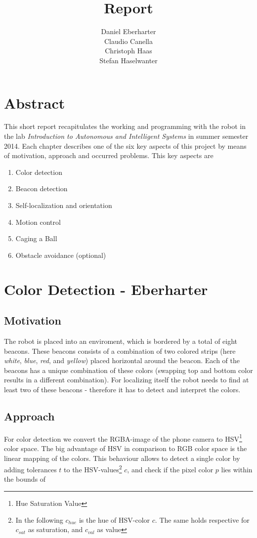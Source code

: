 \documentclass[703031]{iisreport}
\title{\textbf{Report}}
\author{Daniel Eberharter\\ Claudio Canella\\ Christoph Haas\\ Stefan Haselwanter}
\begin{document}
\maketitle

\section{Abstract}
This short report recapitulates the working and programming with the robot in the lab \emph{Introduction to Autonomous and Intelligent Systems} in summer semester 2014. Each chapter describes one of the six key aspects of this project by means of motivation, approach and occurred problems. This key aspects are
\begin{enumerate}
	\item Color detection
	\item Beacon detection
	\item Self-localization and orientation
	\item Motion control
	\item Caging a Ball
	\item Obstacle avoidance (optional)
\end{enumerate}

\section{Color Detection - Eberharter}
\subsection{Motivation}
The robot is placed into an enviroment, which is bordered by a total of eight beacons. These beacons consists of a combination of two colored strips (here \emph{white}, \emph{blue}, \emph{red}, and \emph{yellow}) placed horizontal around the beacon. Each of the beacons has a unique combination of these colors (swapping top and bottom color results in a different combination).
For localizing itself the robot needs to find at least two of these beacons - therefore it has to detect and interpret the colors.

\subsection{Approach}
For color detection we convert the RGBA-image of the phone camera to HSV\footnote{Hue Saturation Value} color space. The big advantage of HSV in comparison to RGB color space is the linear mapping of the colors. This behaviour allows to detect a single color by adding tolerances $t$ to the HSV-values\footnote{In the following $c_{hue}$ is the hue of HSV-color $c$. The same holds respective for $c_{sat}$ as saturation, and $c_{val}$ as value} $c$, and check if the pixel color $p$ lies within the bounds of 
\end{document}
